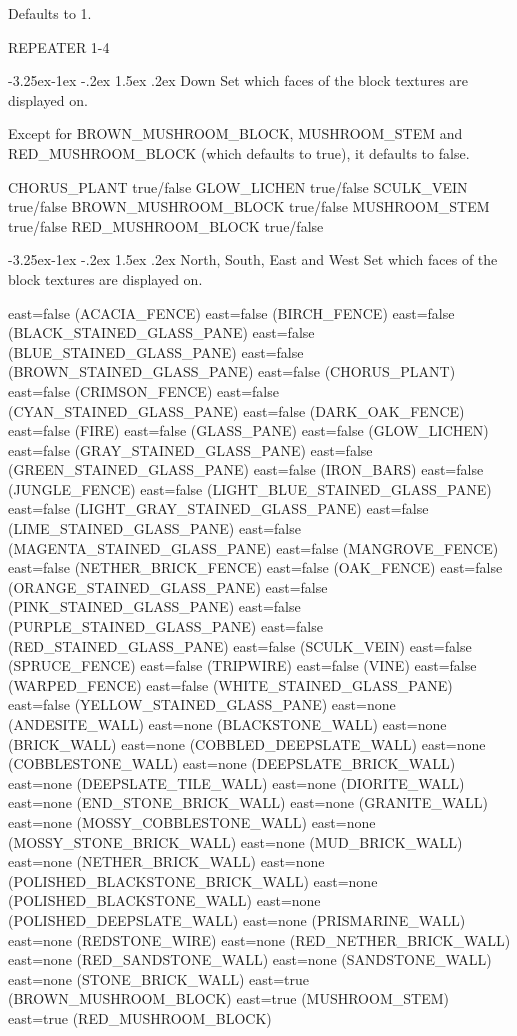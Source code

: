 \documentclass[11pt]{article}
\makeatletter
\renewcommand\subsubsection{\@startsection{subsubsection}{3}{\z@}%
                                        {-3.25ex\@plus -1ex \@minus -.2ex}%
                                         {1.5ex \@plus .2ex}%
                                         {\normalfont\normalsize\fontfamily{phv}\fontsize{14}{17}\selectfont}}
\makeatother
\begin{document}
Defaults to 1.

REPEATER 1-4

\subsubsection{Down}
Set which faces of the block textures are displayed on.

Except for BROWN\_MUSHROOM\_BLOCK, MUSHROOM\_STEM and RED\_MUSHROOM\_BLOCK (which defaults to true), it defaults to false.

CHORUS\_PLANT true/false
GLOW\_LICHEN true/false
SCULK\_VEIN true/false
BROWN\_MUSHROOM\_BLOCK true/false
MUSHROOM\_STEM true/false
RED\_MUSHROOM\_BLOCK true/false

\subsubsection{North, South, East and West}
Set which faces of the block textures are displayed on.

east=false (ACACIA_FENCE)
east=false (BIRCH_FENCE)
east=false (BLACK_STAINED_GLASS_PANE)
east=false (BLUE_STAINED_GLASS_PANE)
east=false (BROWN_STAINED_GLASS_PANE)
east=false (CHORUS_PLANT)
east=false (CRIMSON_FENCE)
east=false (CYAN_STAINED_GLASS_PANE)
east=false (DARK_OAK_FENCE)
east=false (FIRE)
east=false (GLASS_PANE)
east=false (GLOW_LICHEN)
east=false (GRAY_STAINED_GLASS_PANE)
east=false (GREEN_STAINED_GLASS_PANE)
east=false (IRON_BARS)
east=false (JUNGLE_FENCE)
east=false (LIGHT_BLUE_STAINED_GLASS_PANE)
east=false (LIGHT_GRAY_STAINED_GLASS_PANE)
east=false (LIME_STAINED_GLASS_PANE)
east=false (MAGENTA_STAINED_GLASS_PANE)
east=false (MANGROVE_FENCE)
east=false (NETHER_BRICK_FENCE)
east=false (OAK_FENCE)
east=false (ORANGE_STAINED_GLASS_PANE)
east=false (PINK_STAINED_GLASS_PANE)
east=false (PURPLE_STAINED_GLASS_PANE)
east=false (RED_STAINED_GLASS_PANE)
east=false (SCULK_VEIN)
east=false (SPRUCE_FENCE)
east=false (TRIPWIRE)
east=false (VINE)
east=false (WARPED_FENCE)
east=false (WHITE_STAINED_GLASS_PANE)
east=false (YELLOW_STAINED_GLASS_PANE)
east=none (ANDESITE_WALL)
east=none (BLACKSTONE_WALL)
east=none (BRICK_WALL)
east=none (COBBLED_DEEPSLATE_WALL)
east=none (COBBLESTONE_WALL)
east=none (DEEPSLATE_BRICK_WALL)
east=none (DEEPSLATE_TILE_WALL)
east=none (DIORITE_WALL)
east=none (END_STONE_BRICK_WALL)
east=none (GRANITE_WALL)
east=none (MOSSY_COBBLESTONE_WALL)
east=none (MOSSY_STONE_BRICK_WALL)
east=none (MUD_BRICK_WALL)
east=none (NETHER_BRICK_WALL)
east=none (POLISHED_BLACKSTONE_BRICK_WALL)
east=none (POLISHED_BLACKSTONE_WALL)
east=none (POLISHED_DEEPSLATE_WALL)
east=none (PRISMARINE_WALL)
east=none (REDSTONE_WIRE)
east=none (RED_NETHER_BRICK_WALL)
east=none (RED_SANDSTONE_WALL)
east=none (SANDSTONE_WALL)
east=none (STONE_BRICK_WALL)
east=true (BROWN_MUSHROOM_BLOCK)
east=true (MUSHROOM_STEM)
east=true (RED_MUSHROOM_BLOCK)
\end{document}

